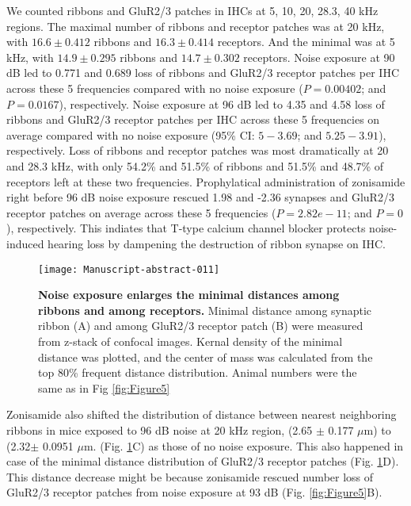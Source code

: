 \documentclass[11pt]{article}
\begin{document}
We counted ribbons and GluR2/3 patches in IHCs at 5, 10, 20, 28.3, 40 kHz regions. The maximal number of ribbons and receptor patches was at 20 kHz, with 
$16.6 \pm 
0.412$ ribbons and 
$16.3 \pm 
0.414$ receptors. 
And the minimal was at 5 kHz, with 
$14.9 \pm 
0.295$ ribbons and 
$14.7 \pm 
0.302$ receptors. 
Noise exposure at 90 dB led to 0.771 and 0.689 loss of ribbons and GluR2/3 receptor patches per IHC across these 5 frequencies compared with no noise exposure 
($P=0.00402$; and 
 $P=0.0167$), respectively. Noise exposure at 96 dB led to 4.35 and 4.58 loss of ribbons and GluR2/3 receptor patches per IHC across these 5 frequencies on average compared with no noise exposure 
(95\% CI: $5 - 3.69$; and 
 $5.25 - 3.91$), respectively. Loss of ribbons and receptor patches was most dramatically at 20 and 28.3 kHz, with only 54.2\% and 51.5\% of ribbons and 
 51.5\% and 48.7\% of receptors left at these two frequencies.
 Prophylatical administration of zonisamide right before 96 dB noise exposure rescued 1.98 and -2.36 synapses and GluR2/3 receptor patches on average across these 5 frequencies 
 ($P=2.82e-11$; and 
 $P=0$), respectively. This indiates that T-type calcium channel blocker protects noise-induced hearing loss by dampening the destruction of ribbon synapse on IHC. 




\begin{figure}[ht!]
\centering
\texttt{[image: Manuscript-abstract-011]}
\caption{{\bf {Noise exposure enlarges the minimal distances among ribbons and among receptors.}}  Minimal distance among synaptic ribbon (A) and among GluR2/3 receptor patch (B) were measured from z-stack of confocal images. Kernal density of the minimal distance was plotted, and the center of mass was calculated from the top 80\% frequent distance distribution. Animal numbers were the same as in Fig \ref{fig:Figure5}}
\label{fig:Figure6}
\end{figure}


Zonisamide also shifted the distribution of distance between nearest neighboring ribbons in mice exposed to 96 dB noise at 20 kHz region,
(2.65 $\pm$ 0.177 $\mu$m) to 
(2.32$\pm$ 0.0951 $\mu$m. (Fig. \ref{fig:Figure6}C) as those of no noise exposure. This also happened in case of the minimal distance distribution of GluR2/3 receptor patches (Fig. \ref{fig:Figure6}D). This distance decrease might be because zonisamide rescued number loss of GluR2/3 receptor patches from noise exposure at 93 dB (Fig. \ref{fig:Figure5}B). 
\end{document}
